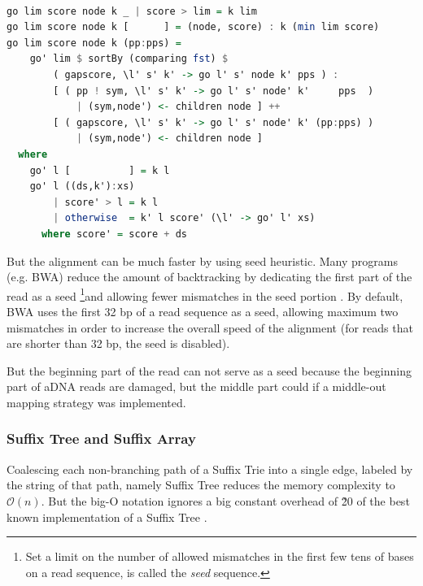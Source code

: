 \documentclass[11pt,a4paper]{report}
\begin{document}
\begin{lstlisting}[language=Haskell, basicstyle=\ttfamily\scriptsize, 
keywordstyle=\color{red}, frame=single ]

go lim score node k _ | score > lim = k lim
go lim score node k [      ] = (node, score) : k (min lim score)
go lim score node k (pp:pps) =
    go' lim $ sortBy (comparing fst) $
        ( gapscore, \l' s' k' -> go l' s' node k' pps ) :                   
        [ ( pp ! sym, \l' s' k' -> go l' s' node' k'     pps  )
            | (sym,node') <- children node ] ++
        [ ( gapscore, \l' s' k' -> go l' s' node' k' (pp:pps) ) 
            | (sym,node') <- children node ]
  where
    go' l [          ] = k l
    go' l ((ds,k'):xs)
        | score' > l = k l               
        | otherwise  = k' l score' (\l' -> go' l' xs)
      where score' = score + ds

\end{lstlisting}

But the alignment can be much faster by using seed 
heuristic. 
Many programs (e.g. BWA) reduce the amount of backtracking  
by dedicating the first part of the read as a seed 
\footnote{ Set a limit on the number of allowed mismatches 
in the first few tens of bases on a read sequence, is called
the \emph{seed} sequence.}and allowing fewer mismatches in 
the seed portion \cite{bwa}. By default, BWA uses the first 
32 bp of a read sequence as a seed, allowing maximum two 
mismatches in order to increase the overall speed of the 
alignment (for reads that are shorter than 32 bp, the seed 
is disabled)\cite{bwa}. 

But the beginning part of the read can not serve as a seed
because the beginning part of aDNA reads are damaged,
but the middle part could if a middle-out mapping strategy
was implemented.




\subsubsection{Suffix Tree and Suffix Array}
\label{Suffix Tree and Suffix Array}

Coalescing each non-branching path of a Suffix Trie into 
a single edge, labeled by the string of that path, namely 
Suffix Tree reduces the memory complexity to $\mathcal{O}(n)$.
But the big-O notation ignores a big constant overhead 
of \~20 of the best known implementation of a Suffix Tree
\cite{gusfield1997algorithms}.\\ 
\end{document}
